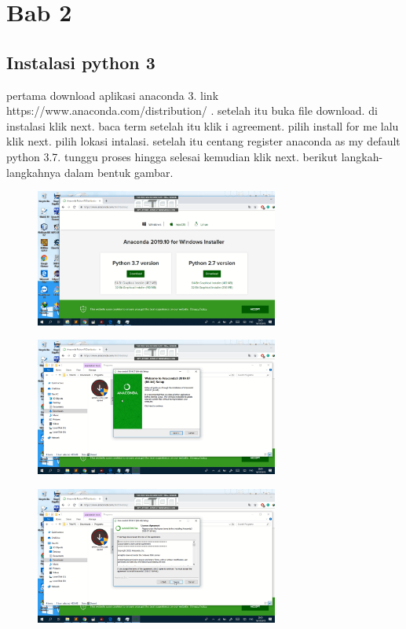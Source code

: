 \chapter{Bab 2}

\section{Instalasi python 3}
pertama download aplikasi anaconda 3. link https://www.anaconda.com/distribution/ . setelah itu buka file download. di instalasi klik next. baca term setelah itu klik i agreement. pilih install for me lalu klik next. pilih lokasi intalasi. setelah itu centang register anaconda as my default python 3.7. tunggu proses hingga selesai kemudian klik next. berikut langkah-langkahnya dalam bentuk gambar.
	
\begin{figure}[H]
	\centering
	\includegraphics[width=8cm]{figures/1.png}	
\end{figure}

\begin{figure}[H]
	\centering
	\includegraphics[width=8cm]{figures/2.png}
\end{figure}

\begin{figure}[H]
	\centering
	\includegraphics[width=8cm]{figures/3.png}
\end{figure}

